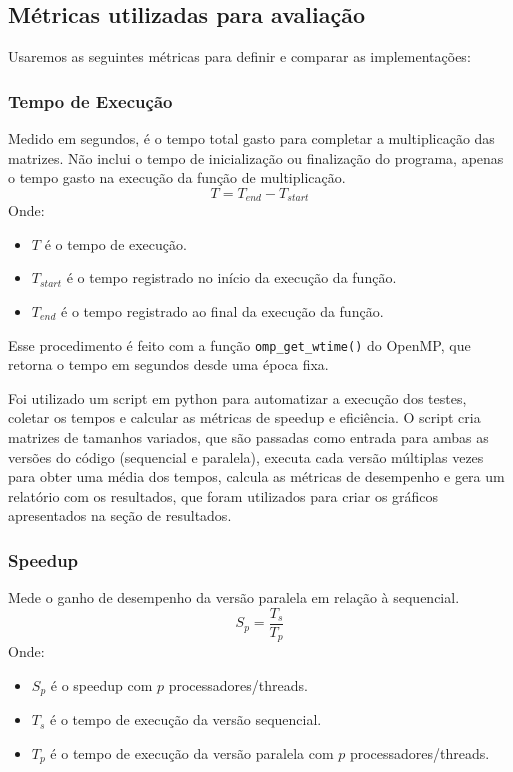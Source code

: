\documentclass[12pt, a4paper]{article}
\begin{document}
	\subsection{Métricas utilizadas para avaliação}
	Usaremos as seguintes métricas para definir e comparar as implementações:

    \subsubsection{Tempo de Execução}

    Medido em segundos, é o tempo total gasto para completar a multiplicação das matrizes. Não inclui o tempo de inicialização ou finalização do programa, apenas o tempo gasto na execução da função de multiplicação.
    \[
        T = T_{end} - T_{start}
    \]
    Onde:
    \begin{itemize}
        \item $T$ é o tempo de execução.
        \item $T_{start}$ é o tempo registrado no início da execução da função.
        \item $T_{end}$ é o tempo registrado ao final da execução da função.
    \end{itemize}

    Esse procedimento é feito com a função \texttt{omp\_get\_wtime()} do OpenMP, que retorna o tempo em segundos desde uma época fixa.

    Foi utilizado um script em python para automatizar a execução dos testes, coletar os tempos e calcular as métricas de speedup e eficiência. O script cria matrizes de tamanhos variados, que são passadas como entrada para ambas as versões do código (sequencial e paralela), executa cada versão múltiplas vezes para obter uma média dos tempos, calcula as métricas de desempenho e gera um relatório com os resultados, que foram utilizados para criar os gráficos apresentados na seção de resultados.

	\subsubsection{Speedup}
	Mede o ganho de desempenho da versão paralela em relação à sequencial.
	\[
		S_{p} = \frac{T_{s}}{T_{p}}
	\]
	Onde:
	\begin{itemize}
		\item $S_{p}$ é o speedup com $p$ processadores/threads.

		\item $T_{s}$ é o tempo de execução da versão sequencial.

		\item $T_{p}$ é o tempo de execução da versão paralela com $p$ processadores/threads.
	\end{itemize}
\end{document}
